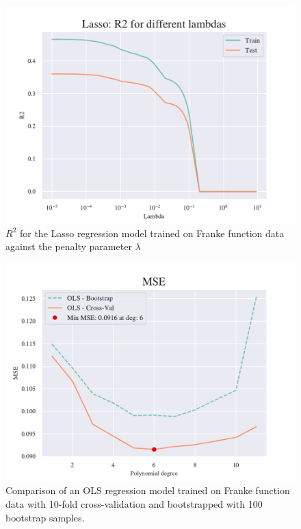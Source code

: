 \begin{figure}[H]
    \centering
    \includegraphics[width=1\linewidth]{project_1/figures/figures_in_appendix/Lasso_R2_Franke_Noise.pdf}
    \caption{$R^2$ for the Lasso regression model trained on Franke function data against the penalty parameter $\lambda$}
    \label{fig:ref5}
\end{figure}

\begin{figure}[H]
    \centering
    \includegraphics[width=1\linewidth]{project_1/figures/figures_in_appendix/CV_BS_OLS_Franke_Noise.pdf}
    \caption{Comparison of an OLS regression model trained on Franke function data with 10-fold cross-validation and bootstrapped with 100 bootstrap samples.}
    \label{fig:ref6}
\end{figure}

